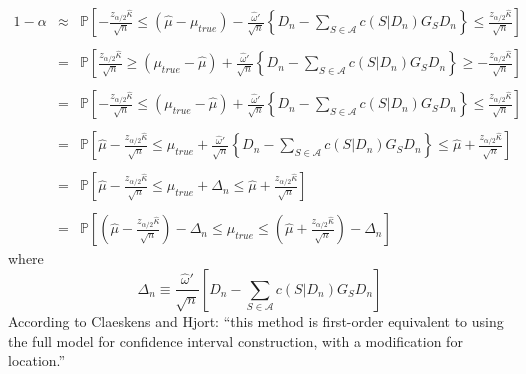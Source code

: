 \documentclass[12pt]{article}
\theoremstyle{definition}
\newcommand{\p}{\mathbb{P}}
\begin{document}
	\begin{eqnarray*}
		1-\alpha&\approx&\p \left[-\frac{z_{\alpha/2}\widehat{\kappa}}{\sqrt{n}} \leq (\hat{\mu} - \mu_{true})  - \frac{\widehat{\omega}'}{\sqrt{n}}\left\{D_n -  \sum_{S\in \mathcal{A}} c(S|D_n)G_S D_n \right\} \leq\frac{z_{\alpha/2}\widehat{\kappa}}{\sqrt{n}} \right]\\\\
	&=&\p \left[\frac{z_{\alpha/2}\widehat{\kappa}}{\sqrt{n}} \geq (\mu_{true} - \hat{\mu})  + \frac{\widehat{\omega}'}{\sqrt{n}}\left\{D_n -  \sum_{S\in \mathcal{A}} c(S|D_n)G_S D_n \right\} \geq -\frac{z_{\alpha/2}\widehat{\kappa}}{\sqrt{n}} \right]\\ \\
	&=&\p \left[-\frac{z_{\alpha/2}\widehat{\kappa}}{\sqrt{n}} \leq (\mu_{true} - \hat{\mu})  + \frac{\widehat{\omega}'}{\sqrt{n}}\left\{D_n -  \sum_{S\in \mathcal{A}} c(S|D_n)G_S D_n \right\} \leq \frac{z_{\alpha/2}\widehat{\kappa}}{\sqrt{n}} \right]\\\\
	&=&\p \left[\hat{\mu}-\frac{z_{\alpha/2}\widehat{\kappa}}{\sqrt{n}} \leq \mu_{true}  + \frac{\widehat{\omega}'}{\sqrt{n}}\left\{D_n -  \sum_{S\in \mathcal{A}} c(S|D_n)G_S D_n \right\} \leq \hat{\mu} + \frac{z_{\alpha/2}\widehat{\kappa}}{\sqrt{n}} \right]\\\\
	&=&\p \left[\hat{\mu}-\frac{z_{\alpha/2}\widehat{\kappa}}{\sqrt{n}} \leq \mu_{true}  + \Delta_n\leq \hat{\mu} + \frac{z_{\alpha/2}\widehat{\kappa}}{\sqrt{n}} \right]\\\\
	&=&\p \left[\left(\hat{\mu}-\frac{z_{\alpha/2}\widehat{\kappa}}{\sqrt{n}}\right) - \Delta_n \leq \mu_{true}  \leq \left(\hat{\mu} + \frac{z_{\alpha/2}\widehat{\kappa}}{\sqrt{n}}\right) - \Delta_n \right]
\end{eqnarray*}
where
	$$\Delta_n \equiv \frac{\widehat{\omega}'}{\sqrt{n}}\left[D_n -  \sum_{S\in \mathcal{A}} c(S|D_n)G_S D_n \right]$$
According to Claeskens and Hjort: ``this method is first-order equivalent to using the full model for confidence interval construction, with a modification for location.''
\end{document}
